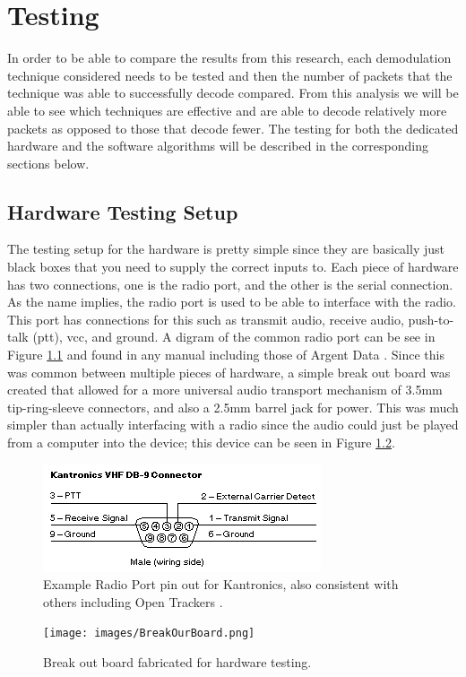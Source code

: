 \chapter{Testing}
In order to be able to compare the results from this research, each demodulation technique considered needs to be tested and then the number of packets that the technique was able to successfully decode compared. From this analysis we will be able to see which techniques are effective and are able to decode relatively more packets as opposed to those that decode fewer. The testing for both the dedicated hardware and the software algorithms will be described in the corresponding sections below.

\section{Hardware Testing Setup}
The testing setup for the hardware is pretty simple since they are basically just black boxes that you need to supply the correct inputs to. Each piece of hardware has two connections, one is the radio port, and the other is the serial connection. As the name implies, the radio port is used to be able to interface with the radio. This port has connections for this such as transmit audio, receive audio, push-to-talk (ptt), vcc, and ground. A digram of the common radio port can be see in Figure \ref{RadioPortPinout} and found in any manual including those of Argent Data \cite{Systems2013}. Since this was common between multiple pieces of hardware, a simple break out board was created that allowed for a more universal audio transport mechanism of 3.5mm tip-ring-sleeve connectors, and also a 2.5mm barrel jack for power. This was much simpler than actually interfacing with a radio since the audio could just be played from a computer into the device; this device can be seen in Figure \ref{BreakOutBoard}. 

\begin{figure}
  \centering
	\includegraphics[width=0.75\linewidth]{images/RadioPortPinout.png} 
	\caption{Example Radio Port pin out for Kantronics, also consistent with others including Open Trackers \cite{Martin2014}.}
   \label{RadioPortPinout}
\end{figure}
\begin{figure}
  \centering
	\texttt{[image: images/BreakOurBoard.png]} 
	\caption{Break out board fabricated for hardware testing.}
   \label{BreakOutBoard}
\end{figure}

